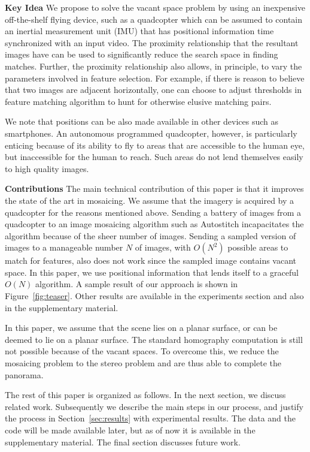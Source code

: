 \documentclass[10pt,twocolumn,letterpaper]{article}
\begin{document}
{\bf Key Idea} We propose to solve the vacant space problem by using
an inexpensive off-the-shelf flying device, such as a quadcopter which
can be assumed to contain an inertial measurement unit (IMU) that has
positional information time synchronized with an input video.  The
proximity relationship that the resultant images have can be used to
significantly reduce the search space in finding matches.  Further,
the proximity relationship also allows, in principle, to vary the
parameters involved in feature selection. For example, if there is
reason to believe that two images are adjacent horizontally, one can
choose to adjust thresholds in feature matching algorithm to hunt for
otherwise elusive matching pairs.

We note that positions can be also made available in other devices
such as smartphones.  An autonomous programmed quadcopter, however, is
particularly enticing because of its ability to fly to areas that are
accessible to the human eye, but inaccessible for the
human to reach.  Such areas do not lend themselves easily to high
quality images.


{\bf Contributions} The main technical contribution of this paper is
that it improves the state of the art in mosaicing.  We assume that
the imagery is acquired by a quadcopter for the reasons mentioned
above. Sending a battery of images from a quadcopter to an image
mosaicing algorithm such as Autostitch
incapacitates the algorithm because of the sheer number of
images. Sending a sampled version of images to a manageable number $N$
of images, with $O(N^2)$ possible areas to match for features, also
does not work since the sampled image contains vacant space.  In this
paper, we use positional information that lends itself to a graceful
$O(N)$ algorithm.  A sample result of our approach is shown in
Figure~\ref{fig:teaser}.  Other results are available in the
experiments section and also in the supplementary material.

In this paper, we assume that the
scene lies on a planar surface, or can be deemed to lie on a planar surface. The
standard homography computation is still not possible because of the
vacant spaces. To overcome this, we reduce the mosaicing problem to
the stereo problem and are thus able to complete the panorama.


The rest of this paper is organized as follows.  In the next section,
we discuss related work.  Subsequently we describe the main steps in
our process, and justify the process in Section~\ref{sec:results} with
experimental results.  The data and the code will be made available
later, but as of now it is available in the supplementary material.
The final section discusses future work.
\end{document}
